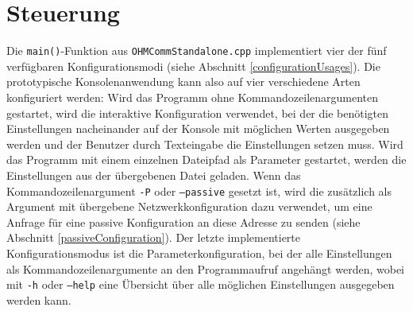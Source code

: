 \section{Steuerung}
Die \texttt{main()}-Funktion aus \texttt{OHMCommStandalone.cpp} implementiert vier der fünf verfügbaren Konfigurationsmodi (siehe Abschnitt \ref{configurationUsages}). Die prototypische Konsolenanwendung kann also auf vier verschiedene Arten konfiguriert werden:
Wird das Programm ohne Kommandozeilenargumenten gestartet, wird die interaktive Konfiguration verwendet, bei der die benötigten Einstellungen nacheinander auf der Konsole mit möglichen Werten ausgegeben werden und der Benutzer durch Texteingabe die Einstellungen setzen muss.  Wird das Programm mit einem einzelnen Dateipfad als Parameter gestartet, werden die Einstellungen aus der übergebenen Datei geladen. Wenn das Kommandozeilenargument \texttt{-P} oder \texttt{--passive} gesetzt ist, wird die zusätzlich als Argument mit übergebene Netzwerkkonfiguration dazu verwendet, um eine Anfrage für eine passive Konfiguration an diese Adresse zu senden (siehe Abschnitt \ref{passiveConfiguration}). Der letzte implementierte Konfigurationsmodus ist die Parameterkonfiguration, bei der alle Einstellungen als Kommandozeilenargumente an den Programmaufruf angehängt werden, wobei mit \texttt{-h} oder \texttt{--help} eine Übersicht über alle möglichen Einstellungen ausgegeben werden kann.
